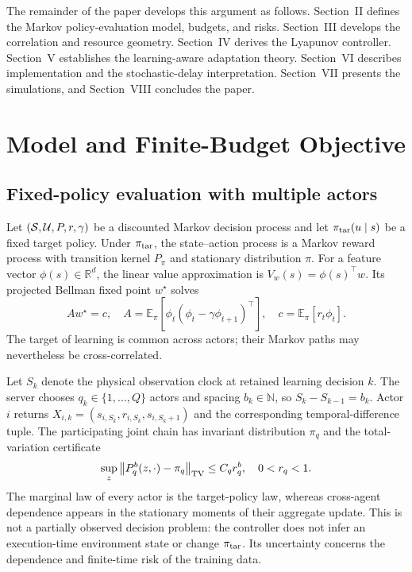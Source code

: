 \documentclass[journal]{IEEEtran}
\newcommand{\E}{\mathbb{E}}
\newcommand{\R}{\mathbb{R}}
\begin{document}
The remainder of the paper develops this argument as follows.
Section~II defines the Markov policy-evaluation model, budgets, and risks.
Section~III develops the correlation and resource geometry.
Section~IV derives the Lyapunov controller.
Section~V establishes the learning-aware adaptation theory.
Section~VI describes implementation and the stochastic-delay interpretation.
Section~VII presents the simulations, and Section~VIII concludes the paper.

\section{Model and Finite-Budget Objective}
\subsection{Fixed-policy evaluation with multiple actors}
Let $({\cal S},{\cal U},P,r,\gamma)$ be a discounted Markov decision process and let $\pi_{\rm tar}(u\mid s)$ be a fixed target policy.
Under $\pi_{\rm tar}$, the state--action process is a Markov reward process with transition kernel $P_{\pi}$ and stationary distribution $\pi$.
For a feature vector $\phi(s)\in\R^d$, the linear value approximation is $V_w(s)=\phi(s)^\top w$.
Its projected Bellman fixed point $w^\star$ solves
\begin{equation}
A w^\star=c,
\quad
A=\E_\pi[\phi_t(\phi_t-\gamma\phi_{t+1})^\top],
\quad
c=\E_\pi[r_t\phi_t].
\label{eq:projected-fixed-point}
\end{equation}
The target of learning is common across actors; their Markov paths may nevertheless be cross-correlated.

Let $S_k$ denote the physical observation clock at retained learning decision $k$.
The server chooses $q_k\in\{1,\ldots,Q\}$ actors and spacing $b_k\in\mathbb{N}$, so $S_k-S_{k-1}=b_k$.
Actor $i$ returns $X_{i,k}=(s_{i,S_k},r_{i,S_k},s_{i,S_k+1})$ and the corresponding temporal-difference tuple.
The participating joint chain has invariant distribution $\pi_q$ and the total-variation certificate
\begin{equation}
\sup_z\left\|P_q^b(z,\cdot)-\pi_q\right\|_{\rm TV}\le C_qr_q^b,
\quad 0<r_q<1.
\label{eq:mixing}
\end{equation}
The marginal law of every actor is the target-policy law, whereas cross-agent dependence appears in the stationary moments of their aggregate update.
This is not a partially observed decision problem: the controller does not infer an execution-time environment state or change $\pi_{\rm tar}$.
Its uncertainty concerns the dependence and finite-time risk of the training data.
\end{document}
